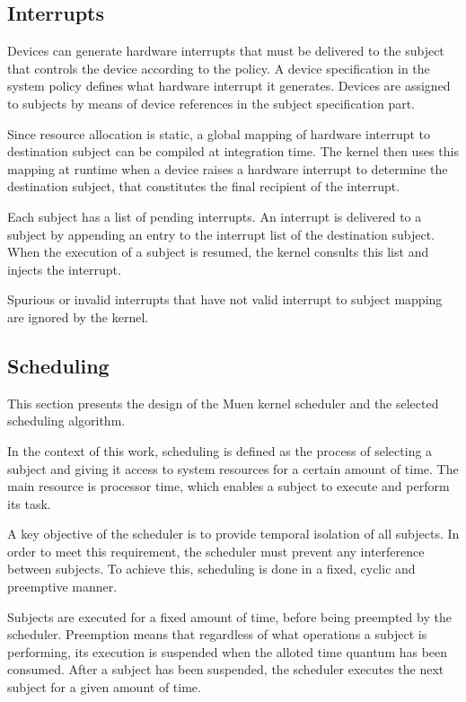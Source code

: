 \subsection{Interrupts}
Devices can generate hardware interrupts that must be delivered to the subject
that controls the device according to the policy. A device specification in the
system policy defines what hardware interrupt it generates. Devices are assigned
to subjects by means of device references in the subject specification part.

Since resource allocation is static, a global mapping of hardware interrupt to
destination subject can be compiled at integration time. The kernel then uses
this mapping at runtime when a device raises a hardware interrupt to determine
the destination subject, that constitutes the final recipient of the interrupt.

Each subject has a list of pending interrupts. An interrupt is delivered to a
subject by appending an entry to the interrupt list of the destination subject.
When the execution of a subject is resumed, the kernel consults this list and
injects the interrupt.

Spurious or invalid interrupts that have not valid interrupt to subject mapping
are ignored by the kernel.

\subsection{Scheduling}\label{subsec:scheduling}
This section presents the design of the Muen kernel scheduler and the selected
scheduling algorithm.

In the context of this work, scheduling is defined as the process of selecting
a subject and giving it access to system resources for a certain amount of time.
The main resource is processor time, which enables a subject to execute and
perform its task.

A key objective of the scheduler is to provide temporal isolation of all
subjects. In order to meet this requirement, the scheduler must prevent any
interference between subjects. To achieve this, scheduling is done in a fixed,
cyclic and preemptive manner.

Subjects are executed for a fixed amount of time, before being preempted by the
scheduler. Preemption means that regardless of what operations a subject is
performing, its execution is suspended when the alloted time quantum has been
consumed. After a subject has been suspended, the scheduler executes the next
subject for a given amount of time.

